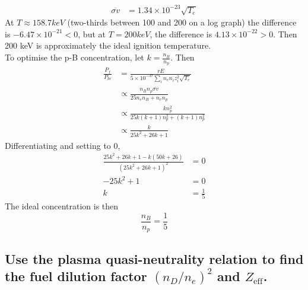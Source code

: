 \documentclass[answers]{exam}
\begin{document}
\begin{questions}
\begin{solution}
\begin{align*}
        \overline{\sigma v} &= 1.34 \times 10^{-23} \sqrt{T_e}
    \end{align*}
    At $T \approx 158.7 \unit{keV}$ (two-thirds between 100 and 200 on a log graph) the difference is $-6.47 \times 10^{-21} < 0$, but at $T = 200 \unit{keV}$, the difference is $4.13 \times 10^{-22} > 0$. Then 200 keV is approximately the ideal ignition temperature. \\
    To optimise the p-B concentration, let $k = \frac{n_B}{n_p}$. Then
    \begin{align*}
        \frac{P_f}{P_{br}} &= \frac{rE}{5\times10^{-37} \sum_i n_en_iz_i^2 \sqrt{T_e}} \\
                           &\propto \frac{n_Bn_p\overline{\sigma v}}{25n_en_B + n_en_p} \\
                           &\propto \frac{kn_p^2}{25k(k+1)n_p^2 + (k+1)n_p^2} \\
                           &\propto \frac{k}{25k^2 + 26k + 1}
    \end{align*}
    Differentiating and setting to 0,
    \begin{align*}
        \frac{25k^2 + 26k + 1 - k(50k + 26)}{\left(25k^2 + 26k + 1\right)^2} &= 0 \\
        -25k^2 + 1 &= 0 \\
        k &= \frac{1}{5}
    \end{align*}
    The ideal concentration is then
    $$\frac{n_B}{n_p} = \frac{1}{5}$$
\end{solution}


\begin{parts}
    
\part{Use the plasma quasi-neutrality relation to find the fuel dilution factor $(n_D/n_e)^2$ and $Z_{\text{eff}}$.}


\end{parts}
\end{questions}
\end{document}
